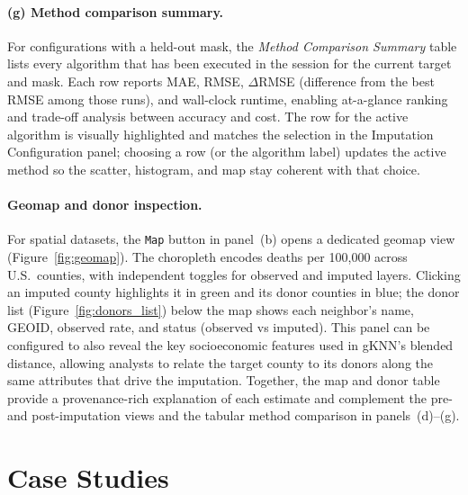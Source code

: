 \documentclass{egpubl}
\begin{document}
\paragraph*{(g) Method comparison summary.}
For configurations with a held-out mask, the \emph{Method Comparison Summary} table lists every algorithm that has been executed in the session for the current target and mask. Each row reports MAE, RMSE, $\Delta$RMSE (difference from the best RMSE among those runs), and wall-clock runtime, enabling at-a-glance ranking and trade-off analysis between accuracy and cost. The row for the active algorithm is visually highlighted and matches the selection in the Imputation Configuration panel; choosing a row (or the algorithm label) updates the active method so the scatter, histogram, and map stay coherent with that choice.

\paragraph*{Geomap and donor inspection.}
For spatial datasets, the \texttt{Map} button in panel~(b) opens a dedicated geomap view (Figure~\ref{fig:geomap}). The choropleth encodes deaths per 100{,}000 across U.S.\ counties, with independent toggles for observed and imputed layers. Clicking an imputed county highlights it in green and its donor counties in blue; the donor list (Figure~\ref{fig:donors_list}) below the map shows each neighbor’s name, GEOID, observed rate, and status (observed vs imputed). This panel can be configured to also reveal the key socioeconomic features used in gKNN’s blended distance, allowing analysts to relate the target county to its donors along the same attributes that drive the imputation. Together, the map and donor table provide a provenance-rich explanation of each estimate and complement the pre- and post-imputation views and the tabular method comparison in panels~(d)–(g).

\vspace{-6pt}
\section{Case Studies}
\label{sec:case-studies}
\end{document}

